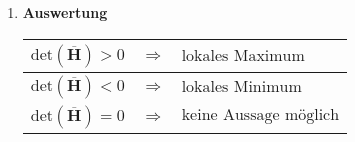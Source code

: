 \begin{enumerate}[itemsep=1ex]
    \item \textbf{Auswertung}\\
    \begin{tabular}{lll}
        \hline
        $\text{det}\left(\overline{\mathbf{H}}\right) > 0$ &$\Longrightarrow$& $\text{lokales Maximum}$\\
        \hline
        $\text{det}\left(\overline{\mathbf{H}}\right) < 0$ &$\Longrightarrow$& $\text{lokales Minimum}$\\
        \hline
        $\text{det}\left(\overline{\mathbf{H}}\right) = 0$ &$\Longrightarrow$& $\text{keine Aussage möglich}$\\
        \hline
    \end{tabular}

\end{enumerate}

